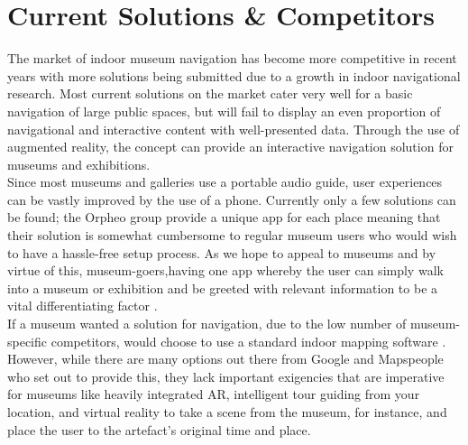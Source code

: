 

\section{Current Solutions \& Competitors}
The market of indoor museum navigation has become more competitive in recent years with more solutions being submitted due to a growth in indoor navigational research. Most current solutions on the market cater very well for a basic navigation of large public spaces, but will fail to display an even proportion of navigational and interactive content with well-presented data. Through the use of augmented reality, the concept can provide an interactive navigation solution for museums and exhibitions.\\
 
Since most museums and galleries use a portable audio guide, user experiences can be vastly improved by the use of a phone. Currently only a few solutions can be found; the Orpheo group \cite{orpheo} provide a unique app for each place meaning that their solution is somewhat cumbersome to regular museum users who would wish to have a hassle-free setup process. As we hope to appeal to museums and by virtue of this, museum-goers,having one app whereby the user can simply walk into a museum or exhibition and be greeted with relevant information to be a vital differentiating factor \cite{microsoft}.\\

If a museum wanted a solution for navigation, due to the low number of museum-specific competitors, would choose to use a standard indoor mapping software \cite{engadget}. However, while there are many options out there from Google and Mapspeople \cite{mapspeople} who set out to provide this, they lack important exigencies that are imperative for museums like heavily integrated AR, intelligent tour guiding from your location, and virtual reality to take a scene from the museum, for instance, and place the user to the artefact's original time and place.